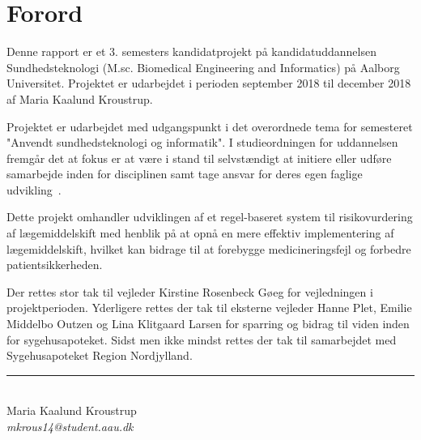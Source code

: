 \chapter*{Forord}
Denne rapport er et 3. semesters kandidatprojekt på kandidatuddannelsen Sundhedsteknologi (M.sc. Biomedical Engineering and Informatics) på Aalborg Universitet. Projektet er udarbejdet i perioden september 2018 til december 2018 af Maria Kaalund Kroustrup. 

Projektet er udarbejdet med udgangspunkt i det overordnede tema for semesteret "Anvendt sundhedsteknologi og informatik". I studieordningen for uddannelsen fremgår det at fokus er at være i stand til selvstændigt at initiere eller udføre samarbejde inden for disciplinen samt tage ansvar for deres egen faglige udvikling~\citep{Studieordning2011}. 

Dette projekt omhandler udviklingen af et regel-baseret system til risikovurdering af lægemiddelskift med henblik på at opnå en mere effektiv implementering af lægemiddelskift, hvilket kan bidrage til at forebygge medicineringsfejl og forbedre patientsikkerheden. 

Der rettes stor tak til vejleder Kirstine Rosenbeck Gøeg for vejledningen i projektperioden. Yderligere rettes der tak til eksterne vejleder Hanne Plet, Emilie Middelbo Outzen og Lina Klitgaard Larsen for sparring og bidrag til viden inden for sygehusapoteket. Sidst men ikke mindst rettes der tak til samarbejdet med Sygehusapoteket Region Nordjylland. 

\vspace{1.5cm}
\begin{center}
\rule{6cm}{0.4pt} \\
Maria Kaalund Kroustrup \\
\textit{mkrous14@student.aau.dk}
\end{center}